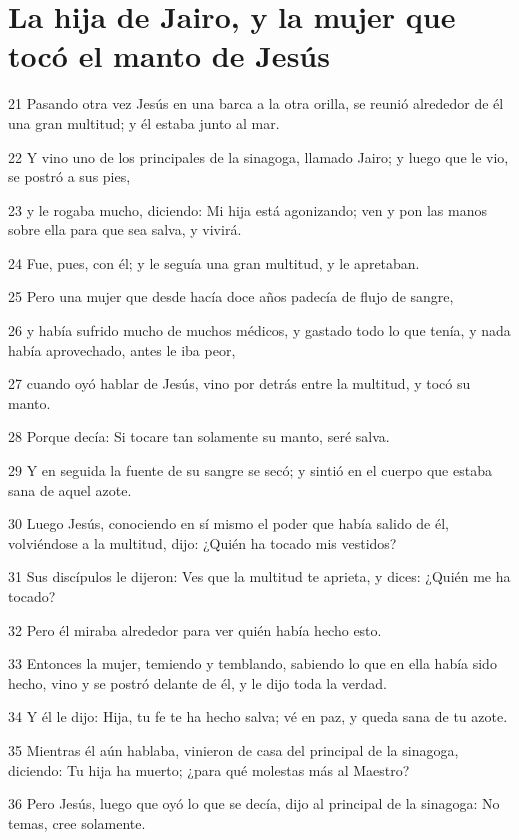 \section*{La hija de Jairo, y la mujer que tocó el manto de Jesús}

\par 21 Pasando otra vez Jesús en una barca a la otra orilla, se reunió alrededor de él una gran multitud; y él estaba junto al mar.
\par 22 Y vino uno de los principales de la sinagoga, llamado Jairo; y luego que le vio, se postró a sus pies,
\par 23 y le rogaba mucho, diciendo: Mi hija está agonizando; ven y pon las manos sobre ella para que sea salva, y vivirá.
\par 24 Fue, pues, con él; y le seguía una gran multitud, y le apretaban.
\par 25 Pero una mujer que desde hacía doce años padecía de flujo de sangre,
\par 26 y había sufrido mucho de muchos médicos, y gastado todo lo que tenía, y nada había aprovechado, antes le iba peor,
\par 27 cuando oyó hablar de Jesús, vino por detrás entre la multitud, y tocó su manto.
\par 28 Porque decía: Si tocare tan solamente su manto, seré salva.
\par 29 Y en seguida la fuente de su sangre se secó; y sintió en el cuerpo que estaba sana de aquel azote.
\par 30 Luego Jesús, conociendo en sí mismo el poder que había salido de él, volviéndose a la multitud, dijo: ¿Quién ha tocado mis vestidos?
\par 31 Sus discípulos le dijeron: Ves que la multitud te aprieta, y dices: ¿Quién me ha tocado?
\par 32 Pero él miraba alrededor para ver quién había hecho esto.
\par 33 Entonces la mujer, temiendo y temblando, sabiendo lo que en ella había sido hecho, vino y se postró delante de él, y le dijo toda la verdad.
\par 34 Y él le dijo: Hija, tu fe te ha hecho salva; vé en paz, y queda sana de tu azote.
\par 35 Mientras él aún hablaba, vinieron de casa del principal de la sinagoga, diciendo: Tu hija ha muerto; ¿para qué molestas más al Maestro?
\par 36 Pero Jesús, luego que oyó lo que se decía, dijo al principal de la sinagoga: No temas, cree solamente.
